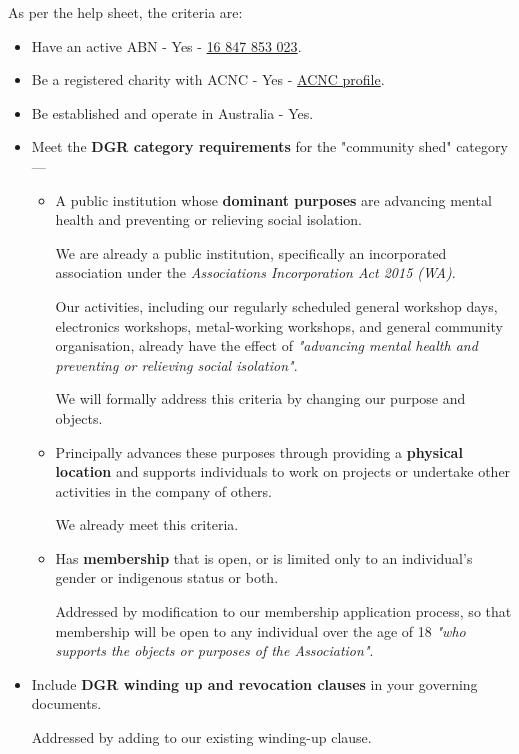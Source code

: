 \documentclass[../constitution.tex]{subfiles}
\begin{document}
\bigskip

As per the help sheet, the criteria are:

\begin{itemize}
    \item Have an active ABN - Yes - \href{https://abr.business.gov.au/ABN/View/16847853023}{16 847 853 023}.
    \item Be a registered charity with ACNC - Yes - \href{https://www.acnc.gov.au/charity/charities/705391a6-3aaf-e811-a963-000d3ad24077/profile}{ACNC profile}.
    \item Be established and operate in Australia - Yes.
    \item Meet the \textbf{DGR category requirements} for the "community shed" category ---
    \begin{itemize}
        \item A public institution whose \textbf{dominant purposes} are advancing mental health and preventing or relieving social isolation.
        
        We are already a public institution, specifically an incorporated association under the \textit{Associations Incorporation Act 2015 (WA)}.
        
        Our activities, including our regularly scheduled general workshop days, electronics workshops, metal-working workshops, and general community organisation, already have the effect of \textit{"advancing mental health and preventing or relieving social isolation"}.
        
        We will formally address this criteria by changing our purpose and objects.
        \item Principally advances these purposes through providing a \textbf{physical location} and supports individuals to work on projects or undertake other activities in the company of others.
        
        We already meet this criteria.
        \item Has \textbf{membership} that is open, or is limited only to an individual's gender or indigenous status or both.
        
        Addressed by modification to our membership application process, so that membership will be open to any individual over the age of 18 \textit{"who supports the objects or purposes of the Association"}.
    \end{itemize}
    \item Include \textbf{DGR winding up and revocation clauses} in your governing documents.
    
    Addressed by adding to our existing winding-up clause.
\end{itemize}
\end{document}
